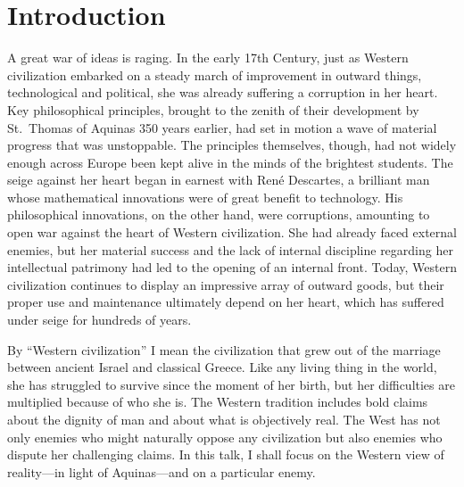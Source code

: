 \documentclass[twocolumn]{article}
\begin{document}
\thispagestyle{fancy}

\section{Introduction}

A great war of ideas is raging.  In the early 17th Century, just as Western
civilization embarked on a steady march of improvement in outward things,
technological and political, she was already suffering a corruption in her
heart.  Key philosophical principles, brought to the zenith of their
development by St.~Thomas of Aquinas 350 years earlier, had set in motion a
wave of material progress that was unstoppable.  The principles themselves,
though, had not widely enough across Europe been kept alive in the minds of the
brightest students.  The seige against her heart began in earnest with Ren\'e
Descartes, a brilliant man whose mathematical innovations were of great benefit
to technology.  His philosophical innovations, on the other hand, were
corruptions, amounting to open war against the heart of Western civilization.
She had already faced external enemies, but her material success and the lack
of internal discipline regarding her intellectual patrimony had led to the
opening of an internal front.  Today, Western civilization continues to display
an impressive array of outward goods, but their proper use and maintenance
ultimately depend on her heart, which has suffered under seige for hundreds of
years.

By ``Western civilization'' I mean the civilization that grew out of the
marriage between ancient Israel and classical Greece.  Like any living thing in
the world, she has struggled to survive since the moment of her birth, but her
difficulties are multiplied because of who she is.  The Western tradition
includes bold claims about the dignity of man and about what is objectively
real.  The West has not only enemies who might naturally oppose any
civilization but also enemies who dispute her challenging claims.  In this
talk, I shall focus on the Western view of reality---in light of Aquinas---and
on a particular enemy.
\end{document}
